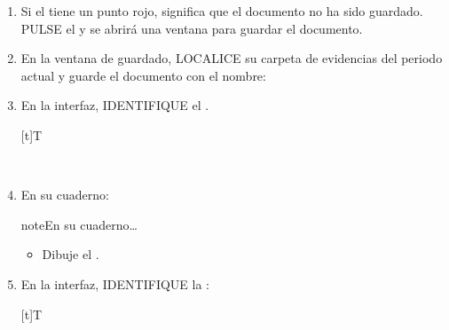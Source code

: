 \documentclass[letterpaper,10pt,spanish]{sphinxmanual}
\let\sphinxpxdimen\pdfpxdimen\else\newdimen\sphinxpxdimen
\begin{document}
\begin{enumerate}
\item {} 
\sphinxAtStartPar
Si el  tiene un punto rojo, significa que el documento no ha sido guardado. PULSE el  y se abrirá una ventana para guardar el documento.

\item {} 
\sphinxAtStartPar
En la ventana de guardado, LOCALICE su carpeta de evidencias del periodo actual y guarde el documento con el nombre: 

\item {} 
\sphinxAtStartPar
En la interfaz, IDENTIFIQUE el .


\begin{savenotes}\sphinxattablestart
\sphinxthistablewithglobalstyle
\centering
\begin{tabulary}{\linewidth}[t]{T}
\sphinxtoprule
\sphinxtableatstartofbodyhook

\begin{sphinxfigure-in-table}
\centering
\capstart
\noindent\sphinxincludegraphics[width=650\sphinxpxdimen]{{image094}.png}
\label{\detokenize{1_guias/10ofimatica/G1013:id5}}\end{sphinxfigure-in-table}\relax
\\
\sphinxbottomrule
\end{tabulary}
\sphinxtableafterendhook\par
\sphinxattableend\end{savenotes}

\item {} 
\sphinxAtStartPar
En su cuaderno:

\begin{sphinxadmonition}{note}{En su cuaderno…}
\begin{itemize}
\item {} 
\sphinxAtStartPar
Dibuje el .

\end{itemize}
\end{sphinxadmonition}

\item {} 
\sphinxAtStartPar
En la interfaz, IDENTIFIQUE la :


\begin{savenotes}\sphinxattablestart
\sphinxthistablewithglobalstyle
\centering
\begin{tabulary}{\linewidth}[t]{T}
\sphinxtoprule
\sphinxtableatstartofbodyhook


\end{tabulary}
\end{savenotes}
\end{enumerate}
\end{document}
